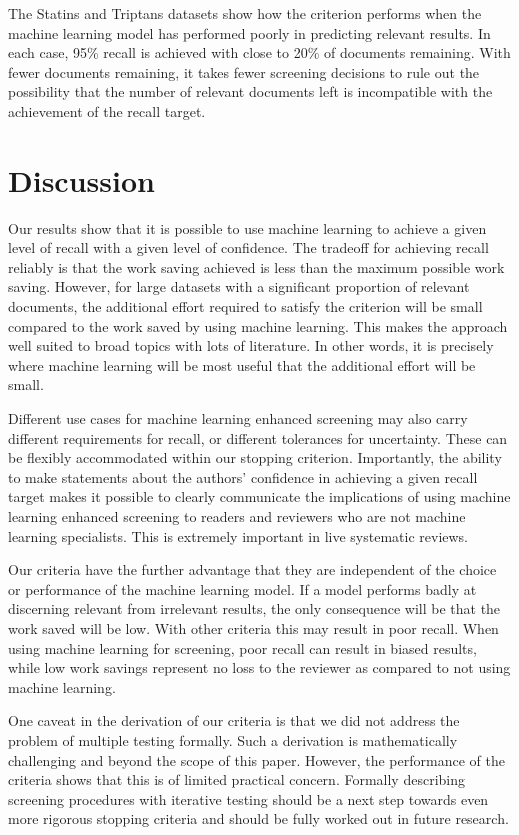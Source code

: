 \documentclass{bmcart}
\begin{document}
	The Statins and Triptans datasets show how the criterion performs when the machine learning model has performed poorly in predicting relevant results. In each case, 95\% recall is achieved with close to 20\% of documents remaining. With fewer documents remaining, it takes fewer screening decisions to rule out the possibility that the number of relevant documents left is incompatible with the achievement of the recall target.
	
	\section*{Discussion}
	
	Our results show that it is possible to use machine learning to achieve a given level of recall with a given level of confidence. The tradeoff for achieving recall reliably is that the work saving achieved is less than the maximum possible work saving. However, for large datasets with a significant proportion of relevant documents, the additional effort required to satisfy the criterion will be small compared to the work saved by using machine learning. This makes the approach well suited to broad topics with lots of literature. In other words, it is precisely where machine learning will be most useful that the additional effort will be small.
	
	Different use cases for machine learning enhanced screening may also carry different requirements for recall, or different tolerances for uncertainty. These can be flexibly accommodated within our stopping criterion. Importantly, the ability to make statements about the authors' confidence in achieving a given recall target makes it possible to clearly communicate the implications of using machine learning enhanced screening to readers and reviewers who are not machine learning specialists. This is extremely important in live systematic reviews.
	
	Our criteria have the further advantage that they are independent of the choice or performance of the machine learning model. If a model performs badly at discerning relevant from irrelevant results, the only consequence will be that the work saved will be low. With other criteria this may result in poor recall. 
	When using machine learning for screening, poor recall can result in biased results, while low work savings represent no loss to the reviewer as compared to not using machine learning.
	
	One caveat in the derivation of our criteria is that we did not address the problem of multiple testing formally. Such a derivation is mathematically challenging and beyond the scope of this paper. However, the performance of the criteria shows that this is of limited practical concern. Formally describing screening procedures with iterative testing should be a next step towards even more rigorous stopping criteria and should be fully worked out in future research.
	
\end{document}
